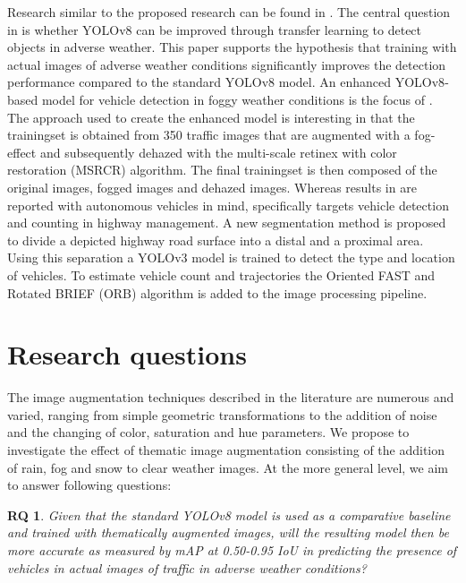 \documentclass[]{article}
\newtheorem{researchquestion}{RQ}
\begin{document}
	Research similar to the proposed research can be found in \cite{kumarObjectDetectionAdverse2023}. The central question in \cite{kumarObjectDetectionAdverse2023} is whether YOLO{\small v8} can be improved through transfer learning to detect objects in adverse weather. This paper supports the hypothesis that training with actual images of adverse weather conditions significantly improves the detection performance compared to the standard YOLO{\small v8} model. An enhanced YOLO\small{v8}-based model for vehicle detection in foggy weather conditions is the focus of \cite{liVehicleDetectionFoggy2022}. The approach used to create the enhanced model is interesting in that the trainingset is obtained from 350 traffic images that are augmented with a fog-effect and subsequently dehazed with the multi-scale retinex with color restoration (MSRCR) algorithm. The final trainingset is then composed of the original images, fogged images and dehazed images. Whereas results in \cite{liVehicleDetectionFoggy2022} are reported with autonomous vehicles in mind, \cite{songVisionbasedVehicleDetection2019} specifically targets vehicle detection and counting in highway management.  A new segmentation method is proposed to divide a depicted highway road surface into a distal and a proximal area. Using this separation a YOLO{\small v3} model is trained to detect the type and location of vehicles. To estimate vehicle count and trajectories the Oriented FAST and Rotated BRIEF (ORB) algorithm is added to the image processing pipeline.
	

\section{Research questions}

	The image augmentation techniques described in the literature are numerous and varied, ranging from simple geometric transformations to the addition of noise and the changing of color, saturation and hue parameters. We propose to investigate the effect of thematic image augmentation consisting of the addition of rain, fog and snow to clear weather images. At the more general level, we aim to answer following questions:

	\begin{researchquestion}
		\label{rq1}
		Given that the standard YOLO{\small v8} model is used as a comparative baseline and trained with thematically augmented images, will the resulting model then be more accurate as measured by mAP at 0.50-0.95 IoU in predicting the presence of vehicles in actual images of traffic in adverse weather conditions?
	\end{researchquestion}
\end{document}

